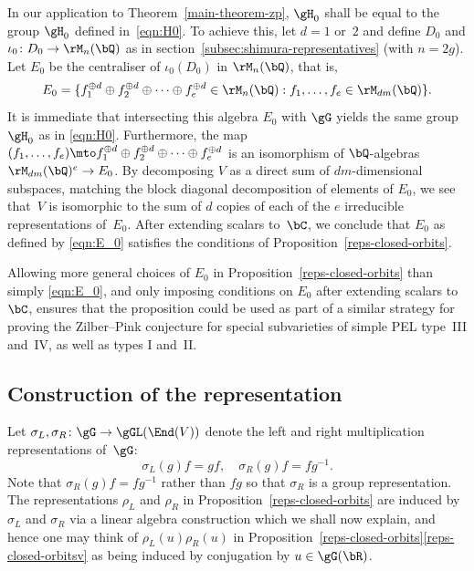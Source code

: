 In our application to Theorem~\ref{main-theorem-zp}, $\gH_0$ shall be equal to the group $\gH_0$ defined in~\eqref{eqn:H0}.
To achieve this, let $d=1$ or~$2$ and define $D_0$ and $\iota_0 \colon D_0 \to \rM_n(\bQ)$ as in section~\ref{subsec:shimura-representatives} (with $n=2g$).
Let $E_0$ be the centraliser of $\iota_0(D_0)$ in $\rM_n(\bQ)$, that is,
\begin{equation} \label{eqn:E_0}
E_0 = \{ f_1^{\oplus d} \oplus f_2^{\oplus d} \oplus \dotsb \oplus f_e^{\oplus d} \in \rM_n(\bQ) :
f_1, \dotsc, f_e \in \rM_{dm}(\bQ) \}.
\end{equation}
It is immediate that intersecting this algebra $E_0$ with $\gG$ yields the same group $\gH_0$ as in \eqref{eqn:H0}.
Furthermore, the map $(f_1, \dotsc, f_e) \mto f_1^{\oplus d} \oplus f_2^{\oplus d} \oplus \dotsb \oplus f_e^{\oplus d}$ is an isomorphism of $\bQ$-algebras $\rM_{dm}(\bQ)^e \to E_0$.
By decomposing $V$ as a direct sum of $dm$-dimensional subspaces, matching the block diagonal decomposition of elements of $E_0$, we see that~$V$ is isomorphic to the sum of $d$ copies of each of the $e$ irreducible representations of~$E_0$.
After extending scalars to~$\bC$, we conclude that $E_0$ as defined by \eqref{eqn:E_0} satisfies the conditions of Proposition~\ref{reps-closed-orbits}.

Allowing more general choices of $E_0$ in Proposition~\ref{reps-closed-orbits} than simply \eqref{eqn:E_0}, and only imposing conditions on $E_0$ after extending scalars to~$\bC$, ensures that the proposition could be used as part of a similar strategy for proving the Zilber--Pink conjecture for special subvarieties of simple PEL type~III and~IV, as well as types I and~II.

\subsection{Construction of the representation}

Let $\sigma_L, \sigma_R \colon \gG \to \gGL(\End(V))$ denote the left and right multiplication representations of~$\gG$:
\begin{equation*}
\sigma_L(g)f = gf, \quad \sigma_R(g)f = fg^{-1}.
\end{equation*}
Note that $\sigma_R(g)f = fg^{-1}$ rather than $fg$ so that $\sigma_R$ is a group representation.
The representations $\rho_L$ and $\rho_R$ in Proposition~\ref{reps-closed-orbits} are induced by $\sigma_L$ and $\sigma_R$ via a linear algebra construction which we shall now explain, and hence one may think of $\rho_L(u)\rho_R(u)$ in Proposition~\ref{reps-closed-orbits}\eqref{reps-closed-orbitsv} as being induced by conjugation by $u \in \gG(\bR)$.

